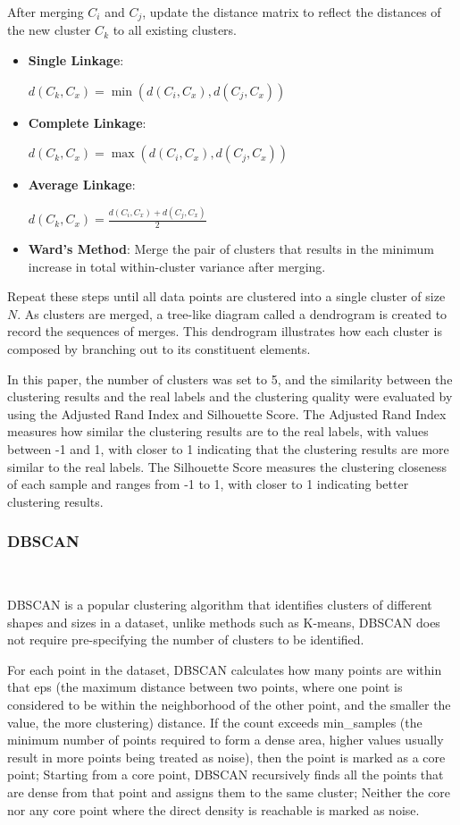 \documentclass[conference]{IEEEtran}
\begin{document}
	After merging $C_i$ and $C_j$, update the distance matrix to reflect the distances of the new cluster $C_k$ to all existing clusters. 
	\begin{itemize}
		\item \textbf{Single Linkage}:
		
		$d(C_k, C_x) = \min(d(C_i, C_x), d(C_j, C_x))$
		\item \textbf{Complete Linkage}: 
		
		$d(C_k, C_x) = \max(d(C_i, C_x), d(C_j, C_x))$
		\item \textbf{Average Linkage}: 
		
		$d(C_k, C_x) = \frac{d(C_i, C_x) + d(C_j, C_x)}{2}$
		\item \textbf{Ward's Method}: Merge the pair of clusters that results in the minimum increase in total within-cluster variance after merging.
	\end{itemize}
	
	Repeat these steps until all data points are clustered into a single cluster of size $N$. As clusters are merged, a tree-like diagram called a dendrogram is created to record the sequences of merges. This dendrogram illustrates how each cluster is composed by branching out to its constituent elements.
	
	In this paper, the number of clusters was set to 5, and the similarity between the clustering results and the real labels and the clustering quality were evaluated by using the Adjusted Rand Index and Silhouette Score. The Adjusted Rand Index measures how similar the clustering results are to the real labels, with values between -1 and 1, with closer to 1 indicating that the clustering results are more similar to the real labels. The Silhouette Score measures the clustering closeness of each sample and ranges from -1 to 1, with closer to 1 indicating better clustering results.
	
	\subsubsection{DBSCAN} \
	
	DBSCAN is a popular clustering algorithm that identifies clusters of different shapes and sizes in a dataset, unlike methods such as K-means, DBSCAN does not require pre-specifying the number of clusters to be identified.
	
	For each point in the dataset, DBSCAN calculates how many points are within that eps (the maximum distance between two points, where one point is considered to be within the neighborhood of the other point, and the smaller the value, the more clustering) distance. If the count exceeds min\_samples (the minimum number of points required to form a dense area, higher values usually result in more points being treated as noise), then the point is marked as a core point; Starting from a core point, DBSCAN recursively finds all the points that are dense from that point and assigns them to the same cluster; Neither the core nor any core point where the direct density is reachable is marked as noise.
	
\end{document}
